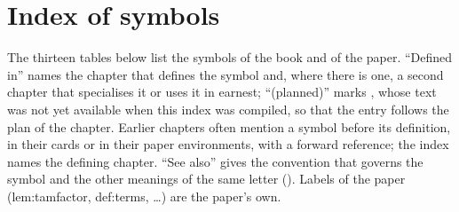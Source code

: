 \section{Index of symbols}\label{sec:notation:index}

The thirteen tables below list the symbols of the book and of the paper. ``Defined in'' names the chapter that defines the
symbol and, where there is one, a second chapter that specialises it or uses it in earnest; ``(planned)'' marks
, whose text was not yet available when this index was compiled, so that the entry follows the plan of the
chapter.
Earlier chapters often mention a symbol before its definition, in their cards or in their paper environments, with a forward
reference; the index names the defining chapter. ``See also'' gives the convention that governs the symbol and the other
meanings of the same letter (). Labels of the paper (lem:tamfactor, def:terms, \dots) are the paper's
own.

